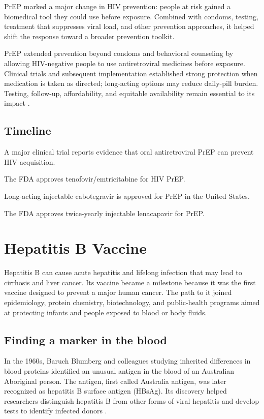 \documentclass[12pt,oneside]{book}
\begin{document}
PrEP marked a major change in HIV prevention: people at risk gained a
biomedical tool they could use before exposure. Combined with condoms,
testing, treatment that suppresses viral load, and other prevention
approaches, it helped shift the response toward a broader prevention toolkit.

PrEP extended prevention beyond condoms and behavioral counseling by allowing
HIV-negative people to use antiretroviral medicines before exposure. Clinical
trials and subsequent implementation established strong protection when
medication is taken as directed; long-acting options may reduce daily-pill
burden. Testing, follow-up, affordability, and equitable availability remain
essential to its impact \cite{cdcPrEPGuidance,fdaYeztugoLabel}.

\section*{Timeline}
\begin{description}[leftmargin=2.3cm,style=nextline]
  \item[2010] A major clinical trial reports evidence that oral antiretroviral PrEP can prevent HIV acquisition.
  \item[2012] The FDA approves tenofovir/emtricitabine for HIV PrEP.
  \item[2021] Long-acting injectable cabotegravir is approved for PrEP in the United States.
  \item[2025] The FDA approves twice-yearly injectable lenacapavir for PrEP.
\end{description}

\chapter[Hepatitis B Vaccine]{Hepatitis B Vaccine}

Hepatitis B can cause acute hepatitis and lifelong infection that may lead to
cirrhosis and liver cancer. Its vaccine became a milestone because it was the
first vaccine designed to prevent a major human cancer. The path to it joined
epidemiology, protein chemistry, biotechnology, and public-health programs
aimed at protecting infants and people exposed to blood or body fluids.

\section{Finding a marker in the blood}
In the 1960s, Baruch Blumberg and colleagues studying inherited differences in blood proteins identified an unusual antigen in the blood of an Australian Aboriginal person. The antigen, first called Australia antigen, was later recognized as hepatitis B surface antigen (HBsAg). Its discovery helped researchers distinguish hepatitis B from other forms of viral hepatitis and develop tests to identify infected donors \cite{cdcHepBvaccine}.
\end{document}
